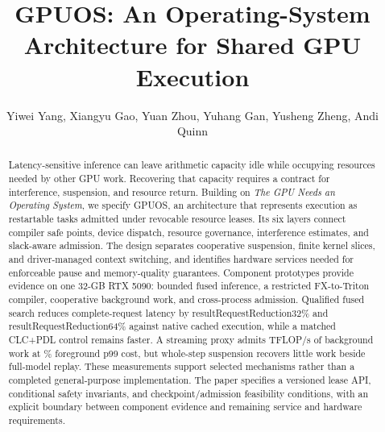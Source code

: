 \documentclass[conference,10pt,letterpaper]{IEEEtran}
\newcommand{\res}[1]{\csname result#1\endcsname}
\begin{document}
\title{GPUOS: An Operating-System Architecture for Shared GPU Execution}
\author{Yiwei Yang, Xiangyu Gao, Yuan Zhou, Yuhang Gan, Yusheng Zheng, Andi Quinn}
\maketitle
\begin{abstract}
Latency-sensitive inference can leave arithmetic capacity idle while occupying
resources needed by other GPU work. Recovering that capacity requires a
contract for interference, suspension, and resource return. Building on
\emph{The GPU Needs an Operating System}, we specify GPUOS, an architecture
that represents execution as restartable tasks admitted under revocable
resource leases. Its six layers connect compiler safe points, device dispatch,
resource governance, interference estimates, and slack-aware admission.
The design separates cooperative suspension, finite kernel slices, and
driver-managed context switching, and identifies hardware services needed
for enforceable pause and memory-quality guarantees.
Component prototypes provide evidence on one 32-GB RTX 5090: bounded fused
inference, a restricted FX-to-Triton compiler, cooperative background work,
and cross-process admission. Qualified fused search reduces complete-request
latency by \res{RequestReduction32}\% and \res{RequestReduction64}\%
against native cached execution, while a matched CLC+PDL control remains
faster. A streaming proxy admits \slackProxyMediumRate{} TFLOP/s of background
work at \slackProxyMediumCost\% foreground p99 cost, but whole-step suspension
recovers little work beside full-model replay. These measurements support
selected mechanisms rather than a completed general-purpose implementation.
The paper specifies a versioned lease API, conditional safety invariants,
and checkpoint/admission feasibility conditions, with an explicit boundary
between component evidence and remaining service and hardware requirements.
\end{abstract}






\label{page:bodyend}
\clearpage


\end{document}
